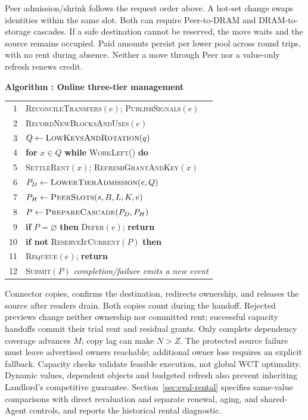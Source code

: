 Peer admission/shrink follows the request order above. A hot-set change
swaps identities within the same slot. Both can require Peer-to-DRAM and
DRAM-to-storage cascades. If a safe destination cannot be reserved, the
move waits and the source remains occupied. Paid amounts persist per
lower pool across round trips, with no rent during absence. Neither a
move through Peer nor a value-only refresh renews credit.

\par\medskip\noindent\begin{minipage}{\columnwidth}
\raggedright
 \label{alg:placement}
 \textbf{Algorithm \thedesignalgorithm: Online three-tier management}
 \par\smallskip
 \begin{tabularx}{\columnwidth}{@{}r@{\quad}X@{}}
 \toprule
 1 & \textsc{ReconcileTransfers}$(e)$; \textsc{PublishSignals}$(e)$ \\
 2 & \textsc{RecordNewBlocksAndUses}$(e)$ \\
 3 & $Q\gets\textsc{LowKeysAndRotation}(q)$ \\
 4 & \textbf{for} $x\in Q$ \textbf{while} \textsc{WorkLeft}() \textbf{do} \\
 5 & \quad \textsc{SettleRent}$(x)$; \textsc{RefreshGrantAndKey}$(x)$ \\
 6 & $P_D\gets\textsc{LowerTierAdmission}(e,Q)$ \\
 7 & $P_H\gets\textsc{PeerSlots}(s,B,L,K,e)$ \\
 8 & $P\gets\textsc{PrepareCascade}(P_D,P_H)$ \\
 9 & \textbf{if} $P=\varnothing$ \textbf{then} \textsc{Defer}$(e)$; \textbf{return} \\
 10 & \textbf{if not} \textsc{ReserveIfCurrent}$(P)$ \textbf{then} \\
 11 & \quad \textsc{Requeue}$(e)$; \textbf{return} \\
 12 & \textsc{Submit}$(P)$ \quad\textit{completion/failure emits a new event} \\
 \bottomrule
 \end{tabularx}
\end{minipage}\par\medskip

Connector copies, confirms the destination, redirects ownership, and
releases the source after readers drain. Both copies count during the
handoff. Rejected previews change neither ownership nor committed rent;
successful capacity handoffs commit their trial rent and residual grants.
Only complete dependency coverage advances $M$; copy lag can make $N>Z$.
The protected source failure must leave advertised owners reachable;
additional owner loss requires an explicit fallback. Capacity checks
validate feasible execution, not global WCT optimality. Dynamic values,
dependent objects and budgeted refresh also prevent inheriting Landlord's
competitive guarantee. Section~\ref{sec:eval-rental} specifies same-value
comparisons with direct revaluation and separate renewal, aging, and
shared-Agent controls, and reports the historical rental diagnostic.

